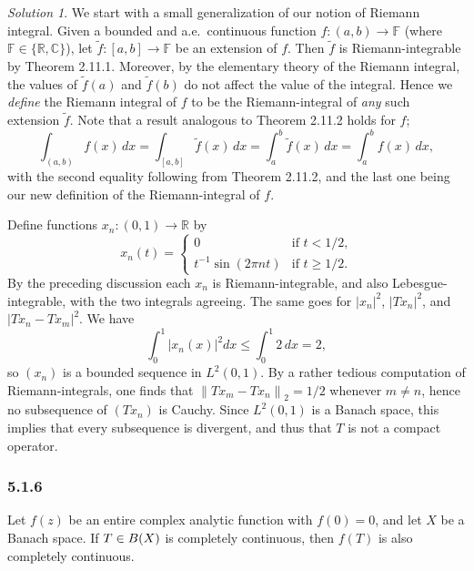 \documentclass{report}
\newcommand{\bb}[1]{\mathbb{#1}}
\newcommand{\norm}[1]{{\lVert #1 \rVert}}
\let\sc\relax
\newcommand{\sc}[1]{\mathscr{#1}}
\theoremstyle{remark}
\newtheorem*{solution}{Solution}
\begin{document}
\begin{solution}
  We start with a small generalization of our notion of Riemann integral. Given a bounded and a.e.\ continuous function $f: (a,b) \to \bb F$ (where $\bb F \in \{\bb R, \bb C\}$), let $\tilde f: [a,b] \to \bb F$ be an extension of $f$. Then $\tilde f$ is Riemann-integrable by Theorem 2.11.1. Moreover, by the elementary theory of the Riemann integral, the values of $\tilde f(a)$ and $\tilde f(b)$ do not affect the value of the integral. Hence we \emph{define} the Riemann integral of $f$ to be the Riemann-integral of \emph{any} such extension $\tilde f$. Note that a result analogous to Theorem 2.11.2 holds for $f$;
  \begin{equation*}
    \int_{(a,b)} f(x) \, dx = \int_{[a,b]} \tilde f(x) \, dx = \int_a^b \tilde f(x) \, dx = \int_a^b f(x) \, dx,
  \end{equation*}
  with the second equality following from Theorem 2.11.2, and the last one being our new definition of the Riemann-integral of $f$.

  Define functions $x_n: (0,1) \to \bb R$ by
  \begin{equation*}
    x_n(t) =
    \begin{cases}
      0 & \text{if $t < 1/2$,} \\
      t^{-1} \sin(2 \pi n t) & \text{if $t \ge 1/2$.}
    \end{cases}
  \end{equation*}
  By the preceding discussion each $x_n$ is Riemann-integrable, and also Lebesgue-integrable, with the two integrals agreeing. The same goes for $|x_n|^2$, $|Tx_n|^2$, and $|Tx_n - Tx_m|^2$. We have
  \begin{equation*}
    \int_0^1 |x_n(x)|^2 dx \le \int_0^1 2 \, dx = 2,
  \end{equation*}
  so $(x_n)$ is a bounded sequence in $L^2(0,1)$. By a rather tedious computation of Riemann-integrals, one finds that $\norm{T x_m - T x_n}_2 = 1/2$ whenever $m \ne n$, hence no subsequence of $(Tx_n)$ is Cauchy. Since $L^2(0,1)$ is a Banach space, this implies that every subsequence is divergent, and thus that $T$ is not a compact operator.
\end{solution}

\subsubsection*{5.1.6}
Let $f(z)$ be an entire complex analytic function with $f(0) = 0$, and let $X$ be a Banach space. If $T \in \sc B(X)$ is completely continuous, then $f(T)$ is also completely continuous.
\end{document}
